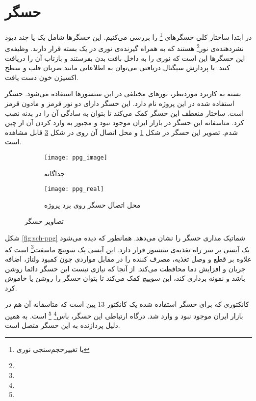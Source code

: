 \section{حسگر }
در ابتدا ساختار کلی حسگرهای
\footnote{ یا تغییرحجم‌سنجی نوری}
را بررسی می‌کنیم. این حسگرها شامل یک یا چند دیود نشردهنده‌ی نور\footnote{} هستند که به همراه گیرنده‌ی نوری در یک بسته قرار دارند. وظیفه‌ی این حسگرها این است که نوری را به داخل بافت بدن بفرستند و بازتاب آن را دریافت کنند. با پردازش سیگنال دریافتی می‌توان به اطلاعاتی مانند ضربان قلب و سطح اکسیژن خون دست یافت.

بسته به کاربرد موردنظر، نورهای مختلفی در این سنسورها استقاده می‌شود. حسگر استفاده شده در این پروژه  نام دارد. این حسگر دارای دو نور قرمز و مادون قرمز است. ساختار منعطف این حسگر کمک می‌کند تا بتوان به سادگی آن را در بدنه نصب کرد. متاسفانه این حسگر در بازار ایران موجود نبود و مجبور به وارد کردن آن از چین شدم. تصویر این حسگر در شکل \ref{fig:ppg_image} و محل اتصال آن روی \pcbf در شکل \ref{fig:ppg_real} قابل مشاهده است.

\begin{figure}[h]
	\centering
	\begin{subfigure}{0.45\textwidth}
		\centering
		\texttt{[image: ppg\_image]}
		\caption{جداگانه}
		\label{fig:ppg_image}
	\end{subfigure}
	\begin{subfigure}{0.35\textwidth}
		\centering
		\texttt{[image: ppg\_real]}
		\caption{محل اتصال حسگر روی برد پروژه}
		\label{fig:ppg_real}
	\end{subfigure}
	\caption{تصاویر حسگر }
\end{figure}

شکل \ref{fig:sch-ppg} شماتیک مداری حسگر  را نشان می‌دهد. همانطور که دیده می‌شود یک آیسی  بر سر راه تغذیه‌ی سنسور قرار دارد. این آیسی یک سوییچ ماسفت\footnote{} است که علاوه بر قطع و وصل تغذیه، مصرف کننده را در مقابل مواردی چون کمبود ولتاژ، اضافه جریان و افزایش دما محافظت می‌کند. از آنجا که نیازی نیست این حسگر دائما روشن باشد و نمونه برداری کند، این سوییچ کمک می‌کند تا بتوان حسگر را روشن یا خاموش کرد.

کانکتوری که برای حسگر استفاده شده یک کانکتور  13 پین است که متاسفانه آن هم در بازار ایران موجود نبود و وارد شد.
درگاه ارتباطی این حسگر، باس\footnote{}
\footnote{}
است. به همین دلیل  پردازنده به این حسگر متصل است.

